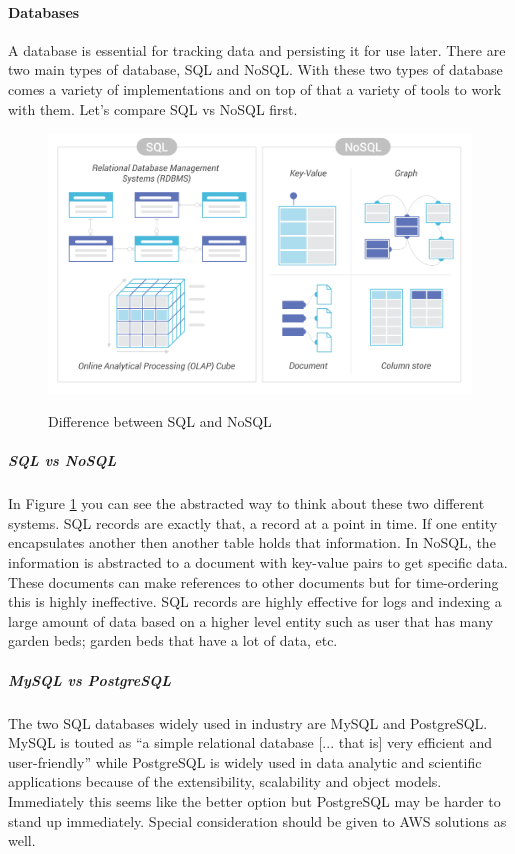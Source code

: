 \paragraph{Databases}
A database is essential for tracking data and persisting it for use later. There are two main types of database, SQL and NoSQL. With these two types of database comes a variety of implementations and on top of that a variety of tools to work with them. Let's compare SQL vs NoSQL first.

\begin{figure}[H]
    \caption{Difference between SQL and NoSQL}
    \centering
    \includegraphics[width=\textwidth]{images/SQL-vs-NoSQL.png}
    \label{fig:sql_vs_nosql}
\end{figure}

\subparagraph{SQL vs NoSQL}
In Figure \ref{fig:sql_vs_nosql} you can see the abstracted way to think about these two different systems. SQL records are exactly that, a record at a point in time. If one entity encapsulates another then another table holds that information. In NoSQL, the information is abstracted to a document with key-value pairs to get specific data. These documents can make references to other documents but for time-ordering this is highly ineffective. SQL records are highly effective for logs and indexing a large amount of data based on a higher level entity such as user that has many garden beds; garden beds that have a lot of data, etc.

\subparagraph{MySQL vs PostgreSQL}
The two SQL databases widely used in industry are MySQL and PostgreSQL. MySQL is touted as ``a simple relational database [... that is] very efficient and user-friendly'' while PostgreSQL is widely used in data analytic and scientific applications because of the extensibility, scalability and object models. Immediately this seems like the better option but PostgreSQL may be harder to stand up immediately. Special consideration should be given to AWS solutions as well. 

